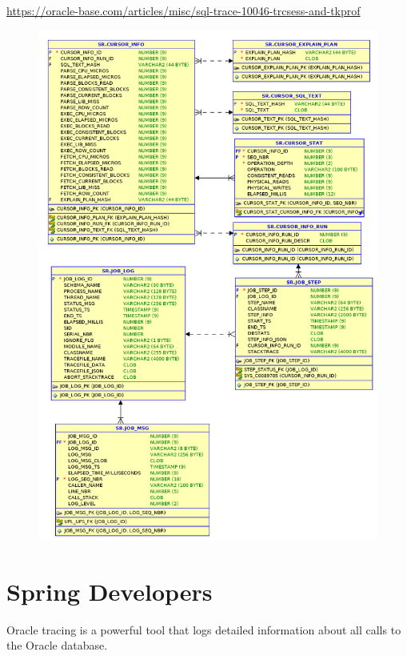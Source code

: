 \documentclass[letterpaper,10pt,english]{sphinxmanual}
\begin{document}
\href{https://oracle-base.com/articles/misc/sql-trace-10046-trcsess-and-tkprof}{https://oracle-base.com/articles/misc/sql-trace-10046-trcsess-and-tkprof}
\begin{figure}[htbp]
\centering

\includegraphics{logger_tables.png}
\end{figure}


\chapter{Spring Developers}
\label{index:spring-developers}
Oracle tracing is a powerful tool that logs detailed information about
all calls to the Oracle database.
\end{document}
